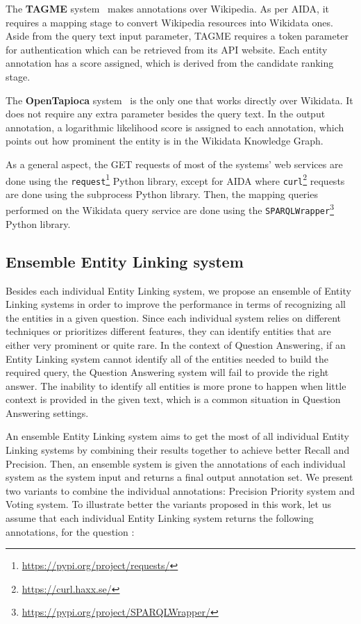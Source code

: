 The \textbf{TAGME} system~\cite{EL:tagme-FerraginaS10} makes annotations over Wikipedia. As 
per AIDA, it requires a mapping stage to convert Wikipedia resources into Wikidata ones. 
Aside from the query text input parameter, TAGME requires a token parameter for authentication 
which can be retrieved from its API website. Each entity annotation has a  score 
assigned, which is derived from the candidate ranking stage.

The \textbf{OpenTapioca} system~\cite{EL:opentapioca-Delpeuch19} is the only one that works 
directly over Wikidata. It does not require any extra parameter besides the query text. In 
the output annotation, a logarithmic likelihood score is assigned to each annotation, which 
points out how prominent the entity is in the Wikidata Knowledge Graph.

As a general aspect, the GET requests of most of the systems’ web services are done using the 
\texttt{request}\footnote{\url{https://pypi.org/project/requests/}} Python library, except for AIDA 
where \texttt{curl}\footnote{\url{https://curl.haxx.se/}} requests are done using the subprocess 
Python library. Then, the mapping queries performed on the Wikidata query service are done 
using the \texttt{SPARQLWrapper}\footnote{\url{https://pypi.org/project/SPARQLWrapper/}} Python 
library.

\subsection{Ensemble Entity Linking system}
\label{cap3:system/entLinModule/ensembleSystems}
Besides each individual Entity Linking system, we propose an ensemble of Entity Linking systems 
in order to improve the performance in terms of recognizing all the entities in a given 
question. Since each individual system relies on different techniques or prioritizes different 
features, they can identify entities that are either very prominent or quite rare. In the 
context of Question Answering, if an Entity Linking system cannot identify all of the entities 
needed to build the required \SPARQL{} query, the Question Answering system will fail to provide 
the right answer. The inability to identify all entities is more prone to happen when little 
context is provided in the given text, which is a common situation in Question Answering 
settings.

An ensemble Entity Linking system aims to get the most of all individual Entity Linking 
systems by combining their results together to achieve better Recall and Precision. Then, an 
ensemble system is given the annotations of each individual system as the system input and 
returns a final output annotation set. We present two variants to combine the individual 
annotations: Precision Priority system and Voting system. To illustrate better the variants 
proposed in this work, let us assume that each individual 
Entity Linking system returns the following annotations, for the question :

